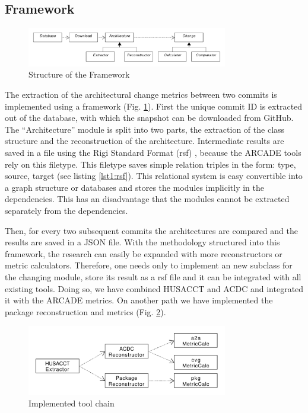 \documentclass[conference]{IEEEtran}
\begin{document}
\subsection{Framework}

\begin{figure}[!t]
	\centering
	\includegraphics[width=3.45in]{assets/architecture.pdf}
	\caption{Structure of the Framework}
	\label{frameworkStructure}
\end{figure}

The extraction of the architectural change metrics between two commits is implemented using a framework (Fig. \ref{frameworkStructure}). First the unique commit ID is extracted out of the database, with which the snapshot can be downloaded from GitHub. 
The ``Architecture'' module is split into two parts, the extraction of the class structure and the reconstruction of the architecture. Intermediate results are saved in a file using the Rigi Standard Format (rsf) \cite{RSF}, because the ARCADE tools rely on this filetype. This filetype saves simple relation triples in the form: type, source, target (see listing \ref{lst1:rsf}). This relational system is easy convertible into a graph structure or databases and stores the modules implicitly in the dependencies. This has an disadvantage that the modules cannot be extracted separately from the dependencies.

Then, for every two subsequent commits the architectures are compared and the results are saved in a JSON file. With the methodology structured into this framework, the research can easily be expanded with more reconstructors or metric calculators. Therefore, one needs only to implement an new subclass for the changing module, store its result as a rsf file and it can be integrated with all existing tools. Doing so, we have combined HUSACCT and ACDC and integrated it with the ARCADE metrics. On another path we have implemented the package reconstruction and metrics (Fig. \ref{implToolchain}).

\begin{figure}[!t]
	\centering
	\includegraphics[width=3.45in]{assets/implementedArc.pdf}
	\caption{Implemented tool chain}
	\label{implToolchain}
\end{figure}
\end{document}
